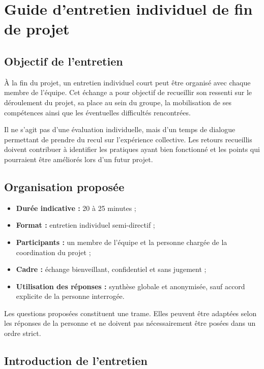 \chapter{Guide d'entretien individuel de fin de projet}
\label{annexe:entretiens-fin-projet}

\section{Objectif de l'entretien}

À la fin du projet, un entretien individuel court peut être organisé avec chaque membre de l'équipe. Cet échange a pour objectif de recueillir son ressenti sur le déroulement du projet, sa place au sein du groupe, la mobilisation de ses compétences ainsi que les éventuelles difficultés rencontrées.

Il ne s'agit pas d'une évaluation individuelle, mais d'un temps de dialogue permettant de prendre du recul sur l'expérience collective. Les retours recueillis doivent contribuer à identifier les pratiques ayant bien fonctionné et les points qui pourraient être améliorés lors d'un futur projet.

\section{Organisation proposée}

\begin{itemize}
    \item \textbf{Durée indicative :} 20 à 25 minutes ;
    \item \textbf{Format :} entretien individuel semi-directif ;
    \item \textbf{Participants :} un membre de l'équipe et la personne chargée de la coordination du projet ;
    \item \textbf{Cadre :} échange bienveillant, confidentiel et sans jugement ;
    \item \textbf{Utilisation des réponses :} synthèse globale et anonymisée, sauf accord explicite de la personne interrogée.
\end{itemize}

Les questions proposées constituent une trame. Elles peuvent être adaptées selon les réponses de la personne et ne doivent pas nécessairement être posées dans un ordre strict.

\section{Introduction de l'entretien}

